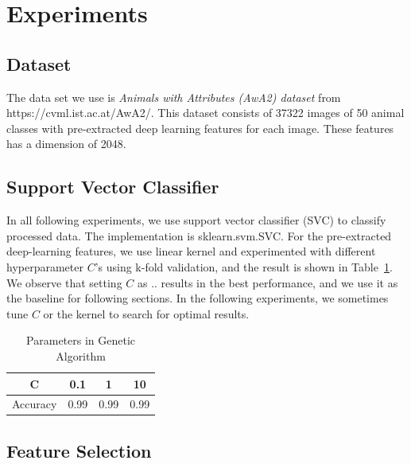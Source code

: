 \documentclass[journal]{IEEEtran}
\begin{document}
\section{Experiments}
\label{sec:3}
\subsection{Dataset}
The data set we use is \emph{Animals with Attributes (AwA2) dataset} from https://cvml.ist.ac.at/AwA2/. This dataset consists of 37322
images of 50 animal classes with pre-extracted deep learning features for each image. These features has a dimension of 2048.
\subsection{Support Vector Classifier}
In all following experiments, we use support vector classifier (SVC) to classify processed data. The implementation is sklearn.svm.SVC. For the pre-extracted deep-learning features, we use linear kernel and experimented with different hyperparameter $C$'s using k-fold validation, and the result is shown in Table~\ref{tab:1}. We observe that setting $C$ as .. results in the best performance, and we use it as the baseline for following sections. In the following experiments, we sometimes tune $C$ or the kernel to search for optimal results. 
\begin{table}[htbp]
\centering
\caption{Parameters in Genetic Algorithm}
\label{tab:1}
\begin{tabular}{cccc}
\toprule
C&0.1&1&10 \\  %
\midrule
Accuracy&0.99&0.99&0.99\\ 
\bottomrule
\end{tabular}
\end{table}
\subsection{Feature Selection}
\end{document}
